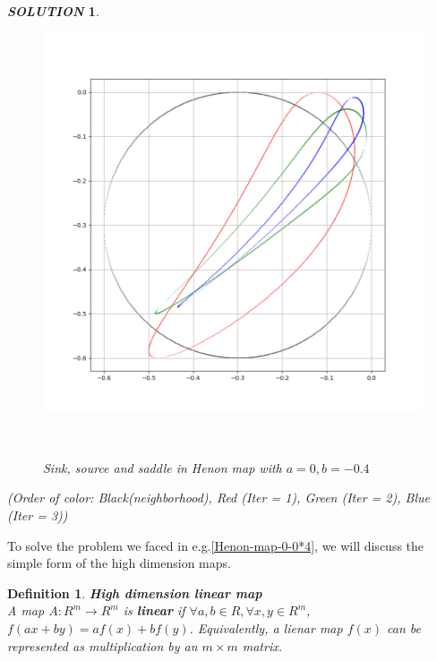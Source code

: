 \documentclass[12pt]{article}
\theoremstyle{plain}
\newtheorem{definition}{{\color{red}\textbf{Definition}}}[section]
\newtheorem{solution}{\textit{SOLUTION}}[section]
\begin{document}
{\begin{solution}
\begin{figure}[H]
\begin{minipage}[c][0.45\width]{0.45\textwidth}
\end{minipage}
\begin{minipage}[c][0.25\width]{0.25\textwidth}
   \centering
   \includegraphics[width=\textwidth]{figure/section2/Henon-0-0*4-saddle.png} 
\end{minipage}
\\[3ex]\caption{Sink, source and saddle in Henon map with $a = 0, b = -0.4$}\label{sink-source-saddle-henon-map}
\end{figure}
(Order of color: {\color{black}Black(neighborhood)}, {\color{red} Red (Iter = 1)}, {\color{green} Green (Iter = 2)}, {\color{blue} Blue (Iter = 3)})

\end{solution}
}



To solve the problem we faced in e.g.\ref{Henon-map-0-0*4}, we will discuss the simple form of the high dimension maps.

\begin{definition}\textbf{High dimension linear map}
\\\noindent A map $A: R^m \rightarrow R^m$ is \textbf{linear} if $\forall a, b \in R, \forall x, y \in R^m$, $f(ax + by) = af(x) + bf(y)$. Equivalently, a lienar map $f(x)$ can be represented as multiplication by an $m \times m$ matrix.
\end{definition}
\end{document}
